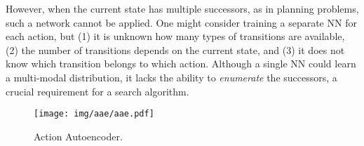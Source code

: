 \documentclass[10pt,letterpaper]{article}
\begin{document}

However, when the current state has multiple successors, as in planning problems, such a network cannot be applied.
One might consider training a separate NN for each action, but
(1) it is unknown how many types of transitions are available,
(2) the number of transitions depends on the current state, and
(3) it does not know which transition belongs to which action.
Although a single NN could learn a multi-modal distribution,
it lacks the ability to \emph{enumerate} the successors,
a crucial requirement for a search algorithm.

\begin{figure}[tbp]
 \centering
 \texttt{[image: img/aae/aae.pdf]}
 \caption{Action Autoencoder.}
 \label{fig:aae}
\end{figure}
\end{document}
